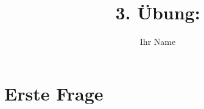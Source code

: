 \documentclass[a4paper,%
twoside,							%
headsepline=true,					%
footsepline=true,					%
headings=normal,
listof=totoc,					%
bibliography=totoc			%
]
{scrartcl}
\begin{document}
\renewcommand*{\thesection}{\arabic{section}}
\renewcommand*{\thesubsection}{\alph{subsection}}
\renewcommand*{\thesubsubsection}{\arabic{subsubsection}}





\subject{Multimediale Informationsverarbeitung}
\title{3. Übung:}
\author{Ihr Name}


\maketitle 						%




\section{Erste Frage}
\label{sec:ErsteFrage}
%
\end{document}
